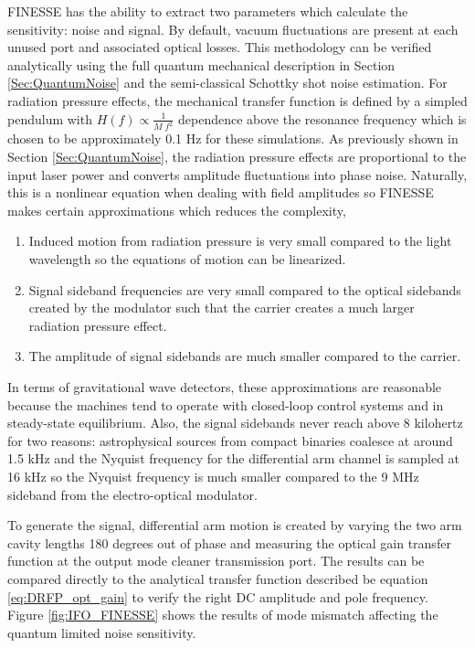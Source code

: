 	FINESSE has the ability to extract two parameters which calculate the sensitivity: noise and signal.  By default, vacuum fluctuations are present at each unused port and associated optical losses.  This methodology can be verified analytically using the full quantum mechanical description in Section \ref{Sec:QuantumNoise} and the semi-classical Schottky shot noise estimation.  For radiation pressure effects, the mechanical transfer function is defined by a simpled pendulum with $H(f) \propto \frac{1}{M \; f^2}$ dependence above the resonance frequency which is chosen to be approximately 0.1 Hz for these simulations.  As previously shown in Section \ref{Sec:QuantumNoise}, the radiation pressure effects are proportional to the input laser power and converts amplitude fluctuations into phase noise.  Naturally, this is a nonlinear equation when dealing with field amplitudes so FINESSE makes certain approximations which reduces the complexity,
	\begin{enumerate}
		\item Induced motion from radiation pressure is very small compared to the light wavelength so the equations of motion can be linearized.
		\item Signal sideband frequencies are very small compared to the optical sidebands created by the modulator such that the carrier creates a much larger radiation pressure effect.
		\item The amplitude of signal sidebands are much smaller compared to the carrier.
	\end{enumerate}
	In terms of gravitational wave detectors, these approximations are reasonable because the machines tend to operate with closed-loop control systems and in steady-state equilibrium.  Also, the signal sidebands never reach above 8 kilohertz for two reasons: astrophysical sources from compact binaries coalesce at around 1.5 kHz and the Nyquist frequency for the differential arm channel is sampled at 16 kHz so the Nyquist frequency is much smaller compared to the 9 MHz sideband from the electro-optical modulator.  
	
	To generate the signal, differential arm motion is created by varying the two arm cavity lengths 180 degrees out of phase and measuring the optical gain transfer function at the output mode cleaner transmission port.  The results can be compared directly to the analytical transfer function described be equation \ref{eq:DRFP_opt_gain} to verify the right DC amplitude and pole frequency.  Figure \ref{fig:IFO_FINESSE} shows the results of mode mismatch affecting the quantum limited noise sensitivity.
	
